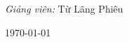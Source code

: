 \documentclass[a4paper,11pt,oneside]{book}
\begin{document}
\begin{titlepage}
\begin{center}
            {\large 
                \emph{Giảng viên:} Từ Lãng Phiêu}\\[1cm]

            \vfill
            
            
            \today %
        \end{center}
    \end{titlepage}
    
\end{document}
